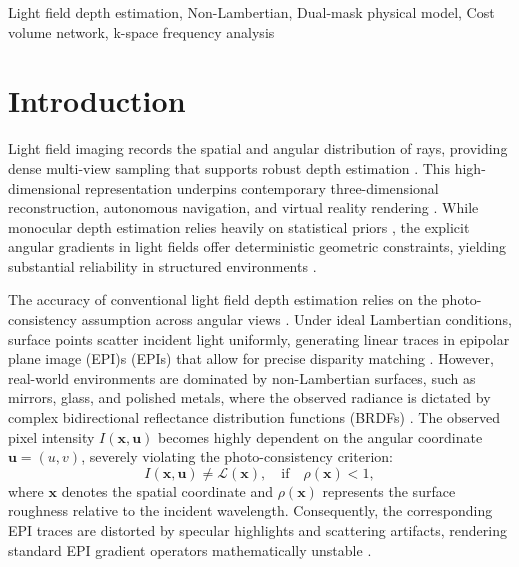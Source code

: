 \documentclass[lettersize,journal]{IEEEtran}
\begin{document}
\begin{IEEEkeywords}
Light field depth estimation, Non-Lambertian, Dual-mask physical model, Cost volume network, k-space frequency analysis
\end{IEEEkeywords}

\section{Introduction}

Light field imaging records the spatial and angular distribution of rays, providing dense multi-view sampling that supports robust depth estimation \cite{ng2005}. This high-dimensional representation underpins contemporary three-dimensional reconstruction, autonomous navigation, and virtual reality rendering \cite{ng2006}. While monocular depth estimation relies heavily on statistical priors \cite{eigen2014, godard2019}, the explicit angular gradients in light fields offer deterministic geometric constraints, yielding substantial reliability in structured environments \cite{honauer2016}.

The accuracy of conventional light field depth estimation relies on the photo-consistency assumption across angular views \cite{wanner2014}. Under ideal Lambertian conditions, surface points scatter incident light uniformly, generating linear traces in epipolar plane image (EPI)s (EPIs) that allow for precise disparity matching \cite{heber2018}. However, real-world environments are dominated by non-Lambertian surfaces, such as mirrors, glass, and polished metals, where the observed radiance is dictated by complex bidirectional reflectance distribution functions (BRDFs) \cite{blinn1977}. The observed pixel intensity $I(\mathbf{x}, \mathbf{u})$ becomes highly dependent on the angular coordinate $\mathbf{u} = (u, v)$, severely violating the photo-consistency criterion:
\begin{equation}
    I(\mathbf{x}, \mathbf{u}) \neq \mathcal{L}(\mathbf{x}), \quad \text{if} \quad \rho(\mathbf{x}) < 1,
\end{equation}
where $\mathbf{x}$ denotes the spatial coordinate and $\rho(\mathbf{x})$ represents the surface roughness relative to the incident wavelength. Consequently, the corresponding EPI traces are distorted by specular highlights and scattering artifacts, rendering standard EPI gradient operators mathematically unstable \cite{li2021}.
\end{document}
